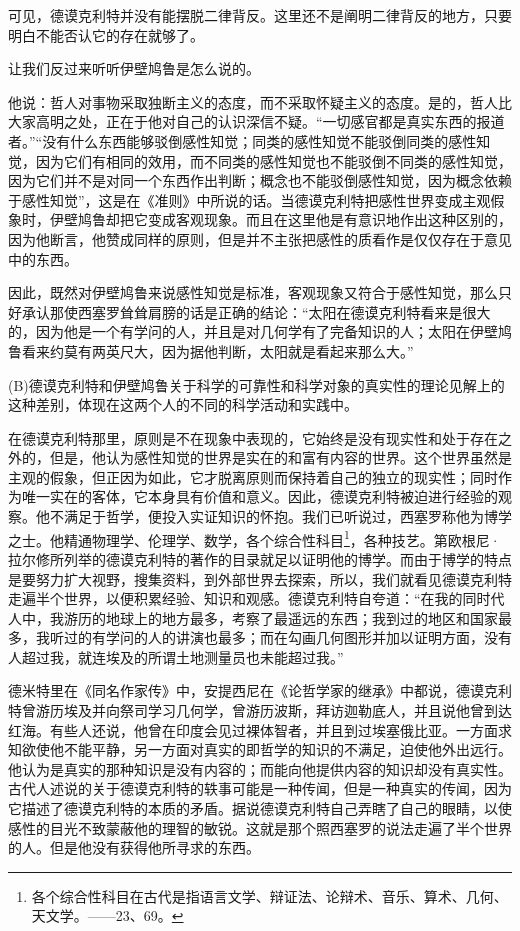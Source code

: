\documentclass[a4paper,twoside,12pt]{ctexart}
\begin{document}
可见，德谟克利特并没有能摆脱二律背反。这里还不是阐明二律背反的地方，只要明白不能否认它的存在就够了。

 让我们反过来听听伊壁鸠鲁是怎么说的。

他说：哲人对事物采取独断主义的态度，而不采取怀疑主义的态度。是的，哲人比大家高明之处，正在于他对自己的认识深信不疑。“一切感官都是真实东西的报道者。”“没有什么东西能够驳倒感性知觉；同类的感性知觉不能驳倒同类的感性知觉，因为它们有相同的效用，而不同类的感性知觉也不能驳倒不同类的感性知觉，因为它们并不是对同一个东西作出判断；概念也不能驳倒感性知觉，因为概念依赖于感性知觉”，这是在《准则》中所说的话。当德谟克利特把感性世界变成主观假象时，伊壁鸠鲁却把它变成客观现象。而且在这里他是有意识地作出这种区别的，因为他断言，他赞成同样的原则，但是并不主张把感性的质看作是仅仅存在于意见中的东西。

因此，既然对伊壁鸠鲁来说感性知觉是标准，客观现象又符合于感性知觉，那么只好承认那使西塞罗耸耸肩膀的话是正确的结论：“太阳在德谟克利特看来是很大的，因为他是一个有学问的人，并且是对几何学有了完备知识的人；太阳在伊壁鸠鲁看来约莫有两英尺大，因为据他判断，太阳就是看起来那么大。”

(B)德谟克利特和伊壁鸠鲁关于科学的可靠性和科学对象的真实性的理论见解上的这种差别，体现在这两个人的不同的科学活动和实践中。

在德谟克利特那里，原则是不在现象中表现的，它始终是没有现实性和处于存在之外的，但是，他认为感性知觉的世界是实在的和富有内容的世界。这个世界虽然是主观的假象，但正因为如此，它才脱离原则而保持着自己的独立的现实性；同时作为唯一实在的客体，它本身具有价值和意义。因此，德谟克利特被迫进行经验的观察。他不满足于哲学，便投入实证知识的怀抱。我们已听说过，西塞罗称他为博学之士。他精通物理学、伦理学、数学，各个综合性科目\footnote{各个综合性科目在古代是指语言文学、辩证法、论辩术、音乐、算术、几何、天文学。——23、69。}，各种技艺。第欧根尼·拉尔修所列举的德谟克利特的著作的目录就足以证明他的博学。而由于博学的特点是要努力扩大视野，搜集资料，到外部世界去探索，所以，我们就看见德谟克利特走遍半个世界，以便积累经验、知识和观感。德谟克利特自夸道：“在我的同时代人中，我游历的地球上的地方最多，考察了最遥远的东西；我到过的地区和国家最多，我听过的有学问的人的讲演也最多；而在勾画几何图形并加以证明方面，没有人超过我，就连埃及的所谓土地测量员也未能超过我。”

德米特里在《同名作家传》中，安提西尼在《论哲学家的继承》中都说，德谟克利特曾游历埃及并向祭司学习几何学，曾游历波斯，拜访迦勒底人，并且说他曾到达红海。有些人还说，他曾在印度会见过裸体智者，并且到过埃塞俄比亚。一方面求知欲使他不能平静，另一方面对真实的即哲学的知识的不满足，迫使他外出远行。他认为是真实的那种知识是没有内容的；而能向他提供内容的知识却没有真实性。古代人述说的关于德谟克利特的轶事可能是一种传闻，但是一种真实的传闻，因为它描述了德谟克利特的本质的矛盾。据说德谟克利特自己弄瞎了自己的眼睛，以使感性的目光不致蒙蔽他的理智的敏锐。这就是那个照西塞罗的说法走遍了半个世界的人。但是他没有获得他所寻求的东西。
\end{document}
